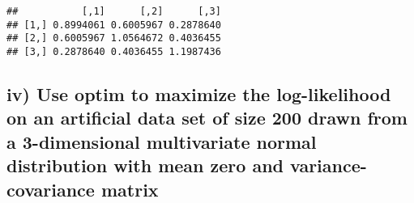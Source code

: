 \documentclass[
]{article}
\begin{document}
\begin{verbatim}
##           [,1]      [,2]      [,3]
## [1,] 0.8994061 0.6005967 0.2878640
## [2,] 0.6005967 1.0564672 0.4036455
## [3,] 0.2878640 0.4036455 1.1987436
\end{verbatim}

\subsection{iv) Use optim to maximize the log-likelihood on an
artificial data set of size 200 drawn from a 3-dimensional multivariate
normal distribution with mean zero and variance-covariance
matrix}\label{iv-use-optim-to-maximize-the-log-likelihood-on-an-artificial-data-set-of-size-200-drawn-from-a-3-dimensional-multivariate-normal-distribution-with-mean-zero-and-variance-covariance-matrix}
\end{document}
